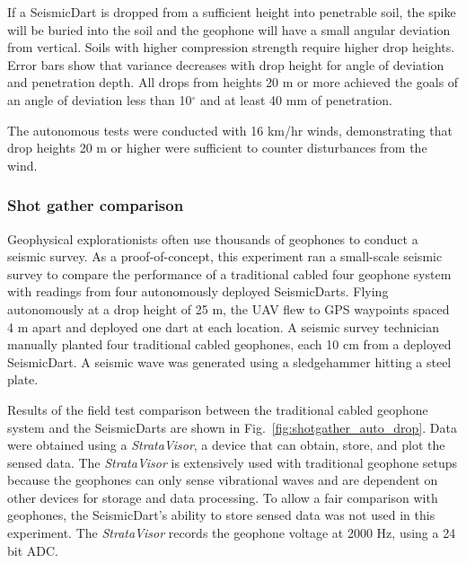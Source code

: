 If a SeismicDart is dropped from a sufficient height into penetrable soil, the spike will be buried into the soil and the geophone will have a small angular deviation from vertical. Soils with higher compression strength require higher drop heights. Error bars show that variance decreases with drop height for angle of deviation and penetration depth.  
 All drops from heights 20 m or more achieved the goals of an angle of deviation less than 10$^\circ$ and at least 40 mm of penetration.   

The autonomous tests were conducted with 16 km/hr winds, demonstrating that drop heights 20 m or higher were sufficient to counter disturbances from the wind. %

\subsubsection{Shot gather comparison} 
Geophysical explorationists often use thousands of geophones to conduct a seismic survey. 
 As a proof-of-concept, this experiment ran a small-scale seismic survey to compare the performance of a traditional cabled four geophone system with readings from four autonomously deployed SeismicDarts.
Flying autonomously at a drop height of 25 m, the UAV flew to GPS waypoints spaced 4 m apart and deployed one dart at each location. 
A seismic survey technician manually planted four traditional cabled geophones, each 10 cm from a deployed SeismicDart. 
A seismic wave was generated using a sledgehammer hitting a steel plate.

Results of the field test comparison between the traditional cabled geophone system and the SeismicDarts are shown in Fig.~\ref{fig:shotgather_auto_drop}.   
Data were obtained using a \emph{StrataVisor}, a device that can obtain, store, and plot the sensed data. 
The \emph{StrataVisor} is extensively used with traditional geophone setups because the geophones can only sense vibrational waves and are dependent on other devices for storage and data processing. 
To allow a fair comparison with geophones, the SeismicDart's  ability to store sensed data was not used in this experiment. 
 The \emph{StrataVisor} records the geophone voltage at 2000 Hz, using a 24 bit ADC.

